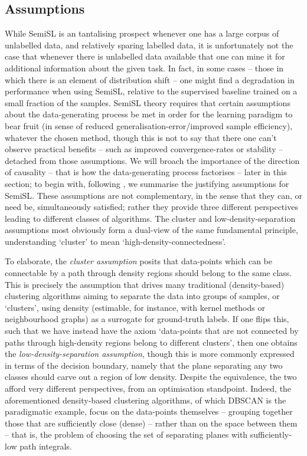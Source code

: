 \subsection{Assumptions}\label{ssec:assumptions}
While SemiSL is an tantalising prospect whenever one has a large corpus of unlabelled data, and
relatively sparing labelled data, it is unfortunately not the case that whenever there is
unlabelled data available that one can mine it for additional information about the given task. 
%
In fact, in some cases -- those in which there is an element of distribution shift -- one might
find a degradation in performance when using SemiSL, relative to the supervised baseline trained on
a small fraction of the samples.
%
SemiSL theory requires that certain assumptions about the data-generating process be met in order
for the learning paradigm to bear fruit (in sense of reduced generalisation-error/improved sample
efficiency), whatever the chosen method, though this is not to say that there one can't observe
practical benefits -- such as improved convergence-rates or stability -- detached from those
assumptions.
%
We will broach the importance of the direction of causality -- that is how the data-generating
process factorises -- later in this section; to begin with, following \citep{chapelle2009semi}, we
summarise the justifying assumptions for SemiSL.
%
These assumptions are not complementary, in the sense that they can, or need be, simultaneously
satisfied; rather they provide three different perspectives leading to different classes of
algorithms. 
%
The cluster and low-density-separation assumptions most obviously form a dual-view of the same
fundamental principle, understanding `cluster' to mean `high-density-connectedness'.

To elaborate, the \emph{cluster assumption} posits that data-points which can be connectable by a
path through density regions should belong to the same class.
%
This is precisely the assumption that drives many traditional (density-based) clustering algorithms
aiming to separate the data into groups of samples, or `clusters', using density (estimable, for
instance, with kernel methods or neighbourhood graphs) as a surrogate for ground-truth labels.
%
 If one flips this, such that we have instead have the
axiom `data-points that are not connected by paths through high-density regions belong to different
clusters', then one obtains the \emph{low-density-separation assumption}, though this is more
commonly expressed in terms of the decision boundary, namely that the plane separating any two
classes should carve out a region of low density.
%
Despite the equivalence, the two afford very different perspectives, from an optimisation
standpoint. Indeed, the aforementioned density-based clustering algorithms, of which DBSCAN
\citep{ester1996density} is the paradigmatic example, focus on the data-points themselves --
grouping together those that are sufficiently close (dense) -- rather than on the space between
them -- that is, the problem of choosing the set of separating planes with sufficiently-low path
integrals.



